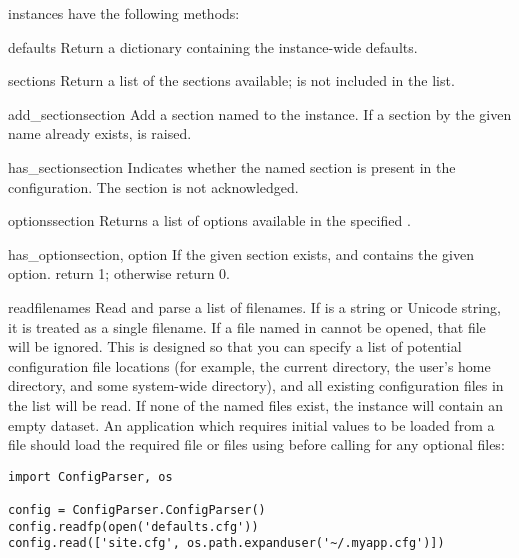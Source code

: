  instances have the following methods:

\begin{methoddesc}{defaults}{}
Return a dictionary containing the instance-wide defaults.
\end{methoddesc}

\begin{methoddesc}{sections}{}
Return a list of the sections available;  is not
included in the list.
\end{methoddesc}

\begin{methoddesc}{add_section}{section}
Add a section named  to the instance.  If a section by
the given name already exists,  is
raised.
\end{methoddesc}

\begin{methoddesc}{has_section}{section}
Indicates whether the named section is present in the
configuration. The  section is not acknowledged.
\end{methoddesc}

\begin{methoddesc}{options}{section}
Returns a list of options available in the specified .
\end{methoddesc}

\begin{methoddesc}{has_option}{section, option}
If the given section exists, and contains the given option. return 1;
otherwise return 0.
\end{methoddesc}

\begin{methoddesc}{read}{filenames}
Read and parse a list of filenames.  If  is a string or
Unicode string, it is treated as a single filename.
If a file named in  cannot be opened, that file will be
ignored.  This is designed so that you can specify a list of potential
configuration file locations (for example, the current directory, the
user's home directory, and some system-wide directory), and all
existing configuration files in the list will be read.  If none of the
named files exist, the  instance will contain an
empty dataset.  An application which requires initial values to be
loaded from a file should load the required file or files using
 before calling  for any optional
files:

\begin{verbatim}
import ConfigParser, os

config = ConfigParser.ConfigParser()
config.readfp(open('defaults.cfg'))
config.read(['site.cfg', os.path.expanduser('~/.myapp.cfg')])
\end{verbatim}
\end{methoddesc}


